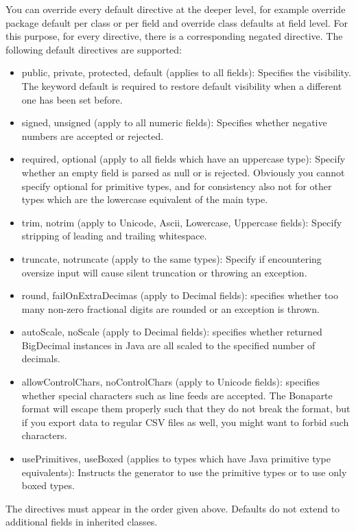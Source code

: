 \documentclass[11pt,a4paper,oneside]{article}
\begin{document}
\noindent You can override every default directive at the deeper level, for example override package default per class or per field and override class defaults
at field level. For this purpose, for every directive, there is a corresponding negated directive.
The following default directives are supported:
\begin{itemize}
  \item {\ttfamily public}, {\ttfamily private}, {\ttfamily protected}, {\ttfamily default} (applies to all fields): Specifies the visibility. The keyword
   {\ttfamily default} is required to restore default visibility when a different one has been set before.
   \item {\ttfamily signed}, {\ttfamily unsigned} (apply to all numeric fields): Specifies whether negative numbers are accepted or rejected.
   \item {\ttfamily required}, {\ttfamily optional} (apply to all fields which have an uppercase type): Specify whether an empty field is parsed as
    {\ttfamily null} or is rejected. Obviously you cannot specify {\ttfamily optional} for primitive types, and for consistency also not for other types which
    are the lowercase equivalent of the main type. 
  \item {\ttfamily trim}, {\ttfamily notrim} (apply to {\ttfamily Unicode}, {\ttfamily Ascii}, {\ttfamily Lowercase}, {\ttfamily Uppercase} fields):
    Specify stripping of leading and trailing whitespace. 
  \item {\ttfamily truncate}, {\ttfamily notruncate} (apply to the same types): Specify if encountering oversize input will cause silent truncation or throwing an exception.
  \item {\ttfamily round}, {\ttfamily failOnExtraDecimas} (apply to {\ttfamily Decimal} fields): specifies whether too many
  non-zero fractional digits are rounded or an exception is thrown.
  \item {\ttfamily autoScale}, {\ttfamily noScale} (apply to {\ttfamily Decimal} fields): specifies
  whether returned {\ttfamily BigDecimal} instances in Java are all scaled to the specified number of decimals.
  \item {\ttfamily allowControlChars}, {\ttfamily noControlChars} (apply to {\ttfamily Unicode} fields): specifies whether special characters such as line feeds are accepted.
    The Bonaparte format will escape them properly such that they do not break the format, but if you export data to regular CSV files as well, you might want to
    forbid such characters.
  \item {\ttfamily usePrimitives}, {\ttfamily useBoxed} (applies to types which have Java primitive type equivalents): Instructs the generator to use the primitive types
    or to use only boxed types. 
\end{itemize}
The directives must appear in the order given above. Defaults do not extend to additional fields in inherited classes.
\end{document}
